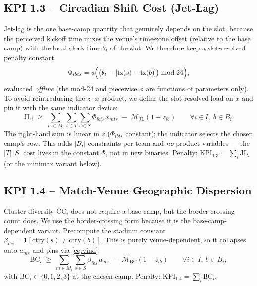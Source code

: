 \documentclass[12pt, letterpaper]{article}
\begin{document}
\subsection{KPI 1.3 -- Circadian Shift Cost (Jet-Lag)}
Jet-lag is the one base-camp quantity that genuinely depends on the slot,
because the perceived kickoff time mixes the venue's time-zone offset
(relative to the base camp) with the local clock time $\theta_t$ of the
slot. We therefore keep a slot-resolved penalty constant
\begin{equation}
\Phi_{ibts}=\phi\!\Bigl(\bigl(\theta_t-[\mathrm{tz}(s)-\mathrm{tz}(b)]\bigr)\bmod 24\Bigr),
\end{equation}
evaluated \emph{offline} (the mod-24 and piecewise $\phi$ are functions of
parameters only). To avoid reintroducing the $z\!\cdot\!x$ product, we
define the slot-resolved load on $x$ and pin it with the same indicator
device:
\begin{equation}
\mathrm{JL}_i \;\ge\;
  \sum_{m\in M_i}\sum_{t\in T}\sum_{s\in S}\Phi_{ibts}\,x_{mts}
  \;-\;\mathcal{M}_{\mathrm{JL}}(1-z_{ib})
  \qquad\forall i\in I,\;b\in B_i.
\end{equation}
The right-hand sum is linear in $x$ ($\Phi_{ibts}$ constant); the
indicator selects the chosen camp's row. This adds $|B_i|$ constraints
per team and \emph{no} product variables --- the $|T|\,|S|$ cost lives in
the constant $\Phi$, not in new binaries. Penalty:
$\mathrm{KPI}_{1.3}=\sum_i \mathrm{JL}_i$ (or the minimax variant below).

\subsection{KPI 1.4 -- Match-Venue Geographic Dispersion}
Cluster diversity $\mathrm{CC}_i$ does not require a base camp, but the
border-crossing count does. We use the border-crossing form because it is
the base-camp-dependent variant. Precompute the stadium constant
$\beta_{ibs}=\mathbf 1[\mathrm{ctry}(s)\neq\mathrm{ctry}(b)]$. This is
purely venue-dependent, so it collapses onto $a_{ms}$ and pins via
\eqref{eq:vind}:
\begin{equation}
\mathrm{BC}_i \;\ge\; \sum_{m\in M_i}\sum_{s\in S}\beta_{ibs}\,a_{ms}
  \;-\;\mathcal{M}_{\mathrm{BC}}(1-z_{ib})
  \qquad\forall i\in I,\;b\in B_i,
\end{equation}
with $\mathrm{BC}_i\in\{0,1,2,3\}$ at the chosen camp. Penalty:
$\mathrm{KPI}_{1.4}=\sum_i \mathrm{BC}_i$.
\end{document}
